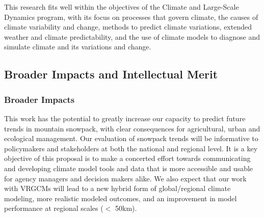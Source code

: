 \documentclass[11pt]{article}
\begin{document}
This research fits well within the objectives of the Climate and Large-Scale Dynamics program, with its focus on processes that govern climate, the causes of climate variability and change, methods to predict climate variations, extended weather and climate predictability, and the use of climate models to diagnose and simulate climate and its variations and change.

\subsection{Broader Impacts and Intellectual Merit}

\subsubsection{Broader Impacts}

This work has the potential to greatly increase our capacity to predict future trends in mountain snowpack, with clear consequences for agricultural, urban and ecological management.  Our evaluation of snowpack trends will be informative to policymakers and stakeholders at both the national and regional level.  It is a key objective of this proposal is to make a concerted effort towards communicating and developing climate model tools and data that is more accessible and usable for agency managers and decision makers alike.  We also expect that our work with VRGCMs will lead to a new hybrid form of global/regional climate modeling, more realistic modeled outcomes, and an improvement in model performance at regional scales ($<$ 50km).

  

\end{document}
